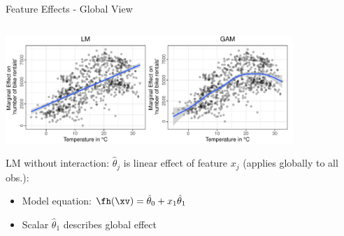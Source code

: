 \documentclass[11pt,compress,t,notes=noshow, aspectratio=169, xcolor=table]{beamer}
\begin{document}



\begin{frame}{Feature Effects - Global View}

\begin{columns}[T, totalwidth=\textwidth]
\begin{column}{0.49\linewidth}
\includegraphics[width=0.85\textwidth, trim=0cm 0.1cm 10.4cm 0cm, clip]{figure/lm_main_effects}

\bigskip
LM without interaction: $\hat\theta_j$ is linear effect of feature $x_j$ (applies globally to all obs.):
\begin{itemize}
    \item Model equation: $\fh(\xv) = \hat\theta_0 + x_1\hat\theta_1$
    \item Scalar $\hat\theta_1$ describes global effect
\end{itemize}
\end{column}\pause
\begin{column}{0.49\linewidth}


\end{column}
\end{columns}
\end{frame}
\end{document}
